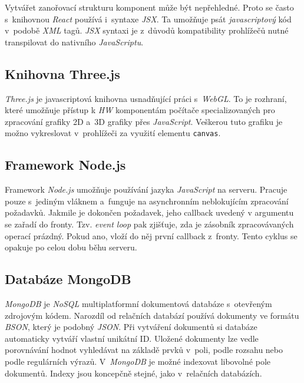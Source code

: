 \documentclass[a4paper,12pt]{article}
\def\code#1{\texttt{#1}}
\begin{document}
Vytvářet zanořovací strukturu komponent může být nepřehledné. Proto se často s~knihovnou \textit{React} používá i~syntaxe \textit{JSX}. Ta umožňuje psát \textit{javascriptový} kód v~podobě \textit{XML} tagů. \textit{JSX} syntaxi je z~důvodů kompatibility prohlížečů nutné transpilovat do nativního \textit{JavaScriptu}.~\cite{jsxsyntax}



\subsection{Knihovna Three.js}

\textit{Three.js} je javascriptová knihovna usnadňující práci s~\textit{WebGL}. To je rozhraní, které umožňuje přístup k \textit{HW} komponentám počítače specializovaných pro zpracování grafiky 2D a~3D grafiky přes \textit{JavaScript}. Veškerou tuto grafiku je možno vykreslovat v~prohlížeči za využití elementu \code{canvas}.~\cite{three}

\subsection{Framework Node.js}

Framework \textit{Node.js} umožňuje používání jazyka \textit{JavaScript} na serveru. Pracuje pouze s~jediným vláknem a~funguje na asynchronním neblokujícím zpracování požadavků. Jakmile je dokončen požadavek, jeho callback uvedený v argumentu se zařadí do fronty.  Tzv. \textit{event loop} pak zjišťuje, zda je zásobník zpracovávaných operací prázdný. Pokud ano, vloží do něj první callback z~fronty. Tento cyklus se opakuje po celou dobu běhu serveru.~\cite{node}

\subsection{Databáze MongoDB}

\textit{MongoDB} je \textit{NoSQL} multiplatformní dokumentová databáze s~otevřeným zdrojovým kódem. Narozdíl od relačních databází používá dokumenty ve formátu \textit{BSON}, který je podobný \textit{JSON}. Při vytváření dokumentů si databáze automaticky vytváří vlastní unikátní ID.  Uložené dokumenty lze vedle porovnávání hodnot vyhledávat na základě prvků v~poli, podle rozsahu nebo podle regulárních výrazů. V~\textit{MongoDB} je možné indexovat libovolné pole dokumentů. Indexy jsou koncepčně stejné, jako v~relačních databázích.~\cite{mongomongoose}
\end{document}

